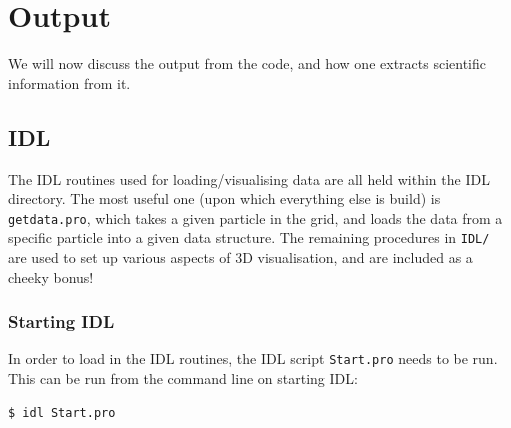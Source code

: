\documentclass[a4paper,11pt,usenames,dvipsnames]{article}
\begin{document}
\section{Output}\label{sec:output}
We will now discuss the output from the code, and how one extracts scientific information from it.
\subsection{IDL}
The IDL routines used for loading/visualising data are all held within the IDL directory. The most useful one (upon which everything else is build) is \texttt{getdata.pro}, which takes a given particle in the grid, and loads the data from a specific particle into a given data structure. The remaining procedures in \texttt{IDL/} are used to set up various aspects of 3D visualisation, and are included as a cheeky bonus!

\subsubsection{Starting IDL}
In order to load in the IDL routines, the IDL script \texttt{Start.pro} needs to be run. This can be run from the command line on starting IDL:
\begin{verbatim}
$ idl Start.pro
\end{verbatim}
\end{document}
